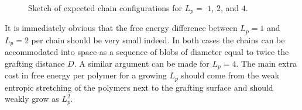 \begin{figure}
	\begin{center}

	\end{center}
	\caption[Sketch of expected chain configurations for $L_p = 1, 2,$ and $4$]{Sketch of expected chain configurations for $L_p =$  $1$,  $2$, and  $4$.}\label{geom}
\end{figure}

It is immediately obvious that the free energy difference between $L_p=1$ and $L_p=2$ per chain should 
be very small indeed. In both cases the chains can be accommodated into space as a sequence 
of blobs of diameter equal to twice the grafting distance $D$.  A similar argument can be made for $L_p=4$. 
The main extra cost in free energy per polymer for a growing $L_p$ should come from the weak entropic stretching of the polymers next to the grafting surface and should weakly grow as $L_p^2$.

